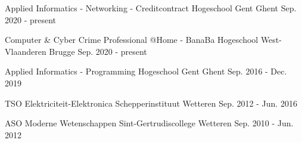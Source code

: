 

\begin{cventries}
	
\cventry
{Applied Informatics - Networking - Creditcontract} %
{Hogeschool Gent} %
{Ghent} %
{Sep. 2020 - present} %

\cventry
{Computer \& Cyber Crime Professional @Home - BanaBa} %
{Hogeschool West-Vlaanderen} %
{Brugge} %
{Sep. 2020 - present} %

\cventry
{Applied Informatics - Programming} %
{Hogeschool Gent} %
{Ghent} %
{Sep. 2016 - Dec. 2019} %

\cventry
{TSO Elektriciteit-Elektronica} %
{Schepperinstituut} %
{Wetteren} %
{Sep. 2012 - Jun. 2016} %

  \cventry
    {ASO Moderne Wetenschappen} %
    {Sint-Gertrudiscollege} %
    {Wetteren} %
    {Sep. 2010 - Jun. 2012} %

\end{cventries}
